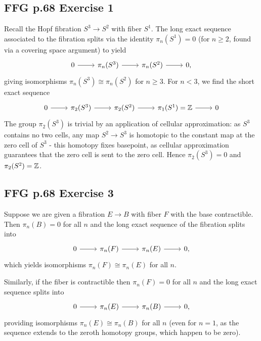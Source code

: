 \documentclass{../mathnotes}
\begin{document}
\subsection*{FFG p.68 Exercise 1}
Recall the Hopf fibration $S^3\to S^2$ with fiber $S^1$. The long exact sequence associated to the
fibration splits via the identity $\pi_n(S^1)=0$ (for $n\geq 2$, found via a covering space argument)
to yield
\begin{equation*}
    \begin{tikzcd}
        0\ar{r} & \pi_n(S^3)\ar{r} & \pi_n(S^2)\ar{r} & 0,
    \end{tikzcd}
\end{equation*}
giving isomorphisms $\pi_n(S^3)\cong\pi_n(S^2)$ for $n\geq 3$. For $n<3$, we find the short
exact sequence
\begin{equation*}
    \begin{tikzcd}
        0\ar{r} & \pi_2(S^3)\ar{r} & \pi_2(S^2)\ar{r} & \pi_1(S^1)=\Z\ar{r} & 0
    \end{tikzcd}
\end{equation*}
The group $\pi_2(S^3)$ is trivial by an application of cellular approximation: as $S^3$ contains
no two cells, any map $S^2\to S^3$ is homotopic to the constant map at the zero cell of $S^3$ - this
homotopy fixes basepoint, as cellular approximation guarantees that the zero cell is sent to the zero cell.
Hence $\pi_2(S^3)=0$ and $\pi_2(S^2)=\mathbb{Z}$.

\subsection*{FFG p.68 Exercise 3}
Suppose we are given a fibration $E\to B$ with fiber $F$ with the base contractible. Then $\pi_n(B)=0$
for all $n$ and the long exact sequence of the fibration splits into
\begin{equation*}
    \begin{tikzcd}
        0\ar{r}&\pi_n(F)\ar{r} & \pi_n(E)\ar{r} & 0,
    \end{tikzcd}
\end{equation*}
which yields isomorphisms $\pi_n(F)\cong\pi_n(E)$ for all $n$.

Similarly, if the fiber is contractible then $\pi_n(F)=0$
for all $n$ and the long exact sequence splits into
\begin{equation*}
    \begin{tikzcd}
        0\ar{r}&\pi_n(E)\ar{r} & \pi_n(B)\ar{r} & 0,
    \end{tikzcd}
\end{equation*}
providing isomorphisms $\pi_n(E)\cong\pi_n(B)$ for all $n$ (even for $n=1$, as the sequence extends
to the zeroth homotopy groups, which happen to be zero).
\end{document}
